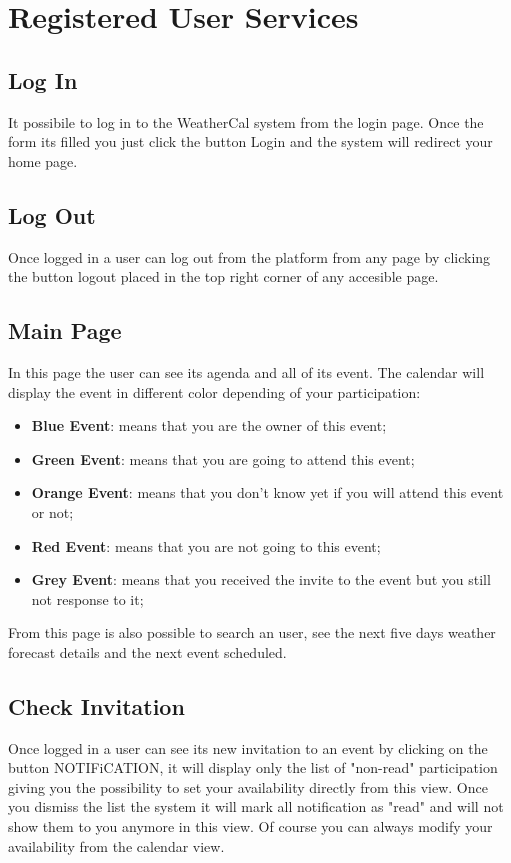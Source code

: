 \section{Registered User Services}
\subsection{Log In}
It possibile to log in to the WeatherCal system from the login page. Once the form its filled you just click the button Login and the system will redirect your home page.
\subsection{Log Out}
Once logged in a user can log out from the platform from any page by clicking the button logout placed in the top right corner of any accesible page.
\subsection{Main Page}
In this page the user can see its agenda and all of its event. The calendar will display the event in different color depending of your participation:
\begin{itemize}
\item {\bf Blue Event}: means that you are the owner of this event;
\item  {\bf Green Event}: means that you are going to attend this event;
\item {\bf Orange Event}: means that you don't know yet if you will attend this event or not;
\item  {\bf Red Event}: means that you are not going to this event;
\item  {\bf Grey Event}: means that you received the invite to the event but you still not response to it;
\end{itemize}
From this page is also possible to search an user, see the next five days weather forecast details and the next event scheduled.
\subsection{Check Invitation}
Once logged in a user can see  its new invitation to an event by clicking on the button NOTIFiCATION, it will display only the list of "non-read" participation giving you the possibility to set your availability directly from this view. Once you dismiss the list the system it will mark all notification as "read" and will not show them to you anymore in this view. Of course you can always modify your availability from the calendar view.  
